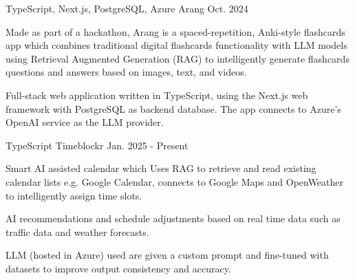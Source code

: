 
\begin{cventries}

  \cventry
    {TypeScript, Next.js, PostgreSQL, Azure} %
    {Arang} %
    {} %
    {Oct. 2024} %
    {
      \begin{cvitems} %
        \item {Made as part of a hackathon, Arang is a spaced-repetition, Anki-style flashcards app which combines traditional digital flashcards
functionality with LLM models using Retrieval Augmented Generation (RAG) to intelligently generate
flashcards questions and answers based on images, text, and videos.}
        \item {Full-stack web application written in TypeScript, using the Next.js web framework with PostgreSQL as
backend database. The app connects to Azure's OpenAI service as the LLM provider.}
      \end{cvitems}
    }

  \cventry
    {TypeScript} %
    {Timeblockr} %
    {} %
    {Jan. 2025 - Present} %
    {
      \begin{cvitems} %
        \item {Smart AI assisted calendar which Uses RAG to retrieve and read existing calendar lists e.g. Google Calendar, connects to Google Maps and OpenWeather to intelligently
assign time slots.}
        \item {AI recommendations and schedule adjustments based on real time data such as traffic data and weather
        forecasts.}
        \item {LLM (hosted in Azure) used are given a custom prompt and fine-tuned with datasets to improve output consistency and accuracy.}
      \end{cvitems}
    }

\end{cventries}
